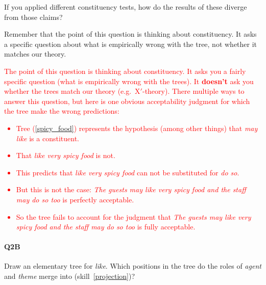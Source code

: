 \documentclass{article}
\begin{document}
If you applied different constituency tests, how do the results of these diverge from those claims?

Remember that the point of this question is thinking about constituency. It asks a specific question about what is empirically wrong with the tree, not whether it matches our theory.
\begin{exe}
    \label{spicy_food}
\end{exe}

\textcolor{red}{
The point of this question is thinking about constituency.
It asks you a fairly specific question (what is empirically wrong with the trees).
It \textbf{doesn't} ask you whether the trees match our theory (e.g.\ X$'$-theory).
There multiple ways to answer this question, but here is one obvious acceptability judgment for which the tree make the wrong predictions:
\begin{itemize}
    \item Tree (\ref{spicy_food}) represents the hypothesis (among other things) that \emph{may like} is a constituent.
    \item That \emph{like very spicy food} is not.
    \item This predicts that \emph{like very spicy food} can not be substituted for \emph{do so}.
    \item But this is not the case: \emph{The guests may like very spicy food and the staff may do so too} is perfectly acceptable.
    \item So the tree fails to account for the judgment that \emph{The guests may like very spicy food and the staff may do so too} is fully acceptable.
\end{itemize}
}

\paragraph{Q2B} Draw an elementary tree for \emph{like}. Which positions in the tree do the roles of \emph{agent} and \emph{theme} merge into (skill~\ref{projection})? 
\end{document}
